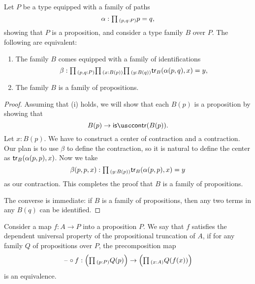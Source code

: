 \begin{lem}\label{lem:case-paths-induction-principle-propositional-truncation}
  Let $P$ be a type equipped with a family of paths
  \begin{equation*}
    \alpha : \prd{p,q:P}p=q,
  \end{equation*}
  showing that $P$ is a proposition, and consider a type family $B$ over $P$. The following are equivalent:
  \begin{enumerate}
  \item The family $B$ comes equipped with a family of identifications
    \begin{equation*}
      \beta:\prd{p,q:P}{x:B(p)}{y:B(q)}\tr_B(\alpha(p,q),x)=y,
    \end{equation*}
  \item The family $B$ is a family of propositions.
  \end{enumerate}
\end{lem}

\begin{proof}
  Assuming that (i) holds, we will show that each $B(p)$ is a proposition by showing that
  \begin{equation*}
    B(p)\to\iscontr(B(p)).
  \end{equation*}
  Let $x:B(p)$. We have to construct a center of contraction and a contraction. Our plan is to use $\beta$ to define the contraction, so it is natural to define the center as $\mathsf{tr}_B(\alpha(p,p),x)$. Now we take
  \begin{equation*}
    \beta(p,p,x):\prd{y:B(p)}\tr_B(\alpha(p,p),x)=y
  \end{equation*}
  as our contraction. This completes the proof that $B$ is a family of propositions.

  The converse is immediate: if $B$ is a family of propositions, then any two terms in any $B(q)$ can be identified.
\end{proof}

\begin{defn}
  Consider a map $f:A\to P$ into a proposition $P$. We say that $f$ satisfies the dependent universal property of the propositional truncation of $A$, if for any family $Q$ of propositions over $P$, the precomposition map
  \begin{equation*}
    \blank\circ f : \Big(\prd{p:P}Q(p)\Big)\to\Big(\prd{x:A}Q(f(x))\Big)
  \end{equation*}
  is an equivalence.
\end{defn}

